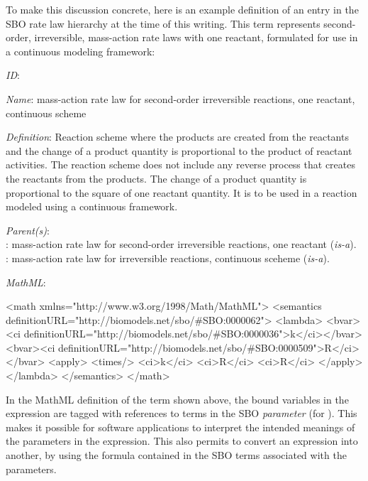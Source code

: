 To make this discussion concrete, here is an example definition of
an entry in the SBO rate law hierarchy at the time of this
writing.  This term represents second-order, irreversible,
mass-action rate laws with one reactant, formulated for use in a
continuous modeling framework:
\begin{description}

\item \emph{ID}: 

\item \emph{Name}: mass-action rate law for second-order
  irreversible reactions, one reactant, continuous scheme

\item \emph{Definition}: Reaction scheme where the products are
  created from the reactants and the change of a product quantity
  is proportional to the product of reactant activities. The
  reaction scheme does not include any reverse process that
  creates the reactants from the products. The change of a product
  quantity is proportional to the square of one reactant quantity.
  It is to be used in a reaction modeled using a continuous
  framework.

\item \emph{Parent(s)}: \\
  : mass-action rate law for second-order
    irreversible reactions, one reactant (\emph{is-a}).
    \\
    : mass-action rate law for irreversible
    reactions, continuous sceheme (\emph{is-a}).
  
\item \emph{MathML}:\vspace*{-1ex}
  \begin{example}
<math xmlns="http://www.w3.org/1998/Math/MathML">
   <semantics definitionURL="http://biomodels.net/sbo/#SBO:0000062">
      <lambda>
         <bvar><ci definitionURL="http://biomodels.net/sbo/#SBO:0000036">k</ci></bvar>
         <bvar><ci definitionURL="http://biomodels.net/sbo/#SBO:0000509">R</ci></bvar>
         <apply>
            <times/>
            <ci>k</ci>
            <ci>R</ci>
            <ci>R</ci>
         </apply>
      </lambda>
   </semantics>
</math>
\end{example}

\end{description}

In the MathML definition of the term shown above, the bound
variables in the  expression are tagged with
references to terms in the SBO \emph{ parameter}  (for
  ).  This makes it
possible for software applications to interpret the intended
meanings of the parameters in the expression.  This also permits
to convert an expression into another, by using the \mathmltwo
formula contained in the SBO terms associated with the parameters.

